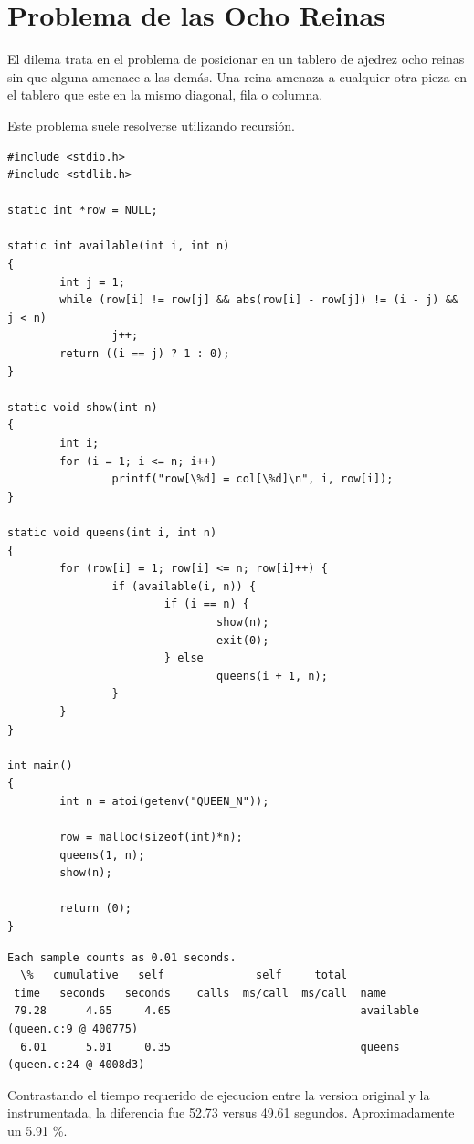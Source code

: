 \documentclass[a4paper]{report}
\begin{document}
\section{Problema de las Ocho Reinas}

El dilema trata en el problema de posicionar en un tablero de ajedrez ocho
reinas sin que alguna amenace a las dem\'as. Una reina amenaza a cualquier otra
pieza en el tablero que este en la mismo diagonal, fila o columna.

\bigskip

Este problema suele resolverse utilizando recursi\'on.

\begin{verbatim}
#include <stdio.h>
#include <stdlib.h>

static int *row = NULL;

static int available(int i, int n)
{
        int j = 1;
        while (row[i] != row[j] && abs(row[i] - row[j]) != (i - j) && j < n)
                j++;
        return ((i == j) ? 1 : 0);
}

static void show(int n)
{
        int i;
        for (i = 1; i <= n; i++)
                printf("row[\%d] = col[\%d]\n", i, row[i]);
}

static void queens(int i, int n)
{
        for (row[i] = 1; row[i] <= n; row[i]++) {
                if (available(i, n)) {
                        if (i == n) {
                                show(n);
                                exit(0);
                        } else
                                queens(i + 1, n);
                }
        }
}

int main()
{
        int n = atoi(getenv("QUEEN_N"));

        row = malloc(sizeof(int)*n);
        queens(1, n);
        show(n);

        return (0);
}
\end{verbatim}

\begin{verbatim}
Each sample counts as 0.01 seconds.
  \%   cumulative   self              self     total
 time   seconds   seconds    calls  ms/call  ms/call  name
 79.28      4.65     4.65                             available (queen.c:9 @ 400775)
  6.01      5.01     0.35                             queens (queen.c:24 @ 4008d3)
\end{verbatim}

Contrastando el tiempo requerido de ejecucion entre la version original y la instrumentada,
la diferencia fue 52.73 versus 49.61 segundos. Aproximadamente un 5.91 \%.
\end{document}
